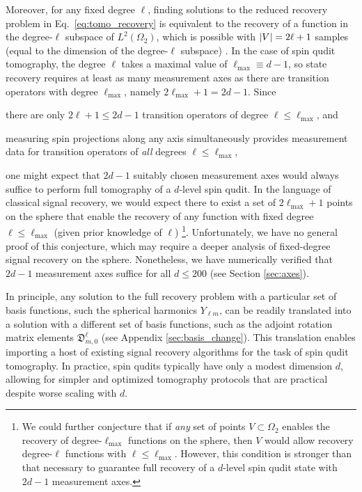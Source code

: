 \documentclass[notitlepage,twocolumn]{revtex4-2}
\renewcommand{\t}{\text} %
\newcommand{\p}[1]{\left(#1\right)} %
\newcommand{\1}{\mathds{1}}
\newcommand{\D}{\mathfrak{D}}
\begin{document}
Moreover, for any fixed degree $\ell$, finding solutions to the reduced recovery problem in Eq.~\eqref{eq:tomo_recovery} is equivalent to the recovery of a function in the degree-$\ell$ subspace of $L^2\p{\Omega_2}$, which is possible with $\abs{V}=2\ell+1$ samples (equal to the dimension of the degree-$\ell$ subspace) \cite{freeden2008spherical}.
In the case of spin qudit tomography, the degree $\ell$ takes a maximal value of $\ell_{\t{max}}\equiv d-1$, so state recovery requires at least as many measurement axes as there are transition operators with degree $\ell_{\t{max}}$, namely $2\ell_{\t{max}}+1=2d-1$.
Since
\begin{enumerate*}
\item there are only $2\ell+1\le2d-1$ transition operators of degree $\ell\le\ell_{\t{max}}$, and
\item measuring spin projections along any axis simultaneously provides measurement data for transition operators of {\it all} degrees $\ell\le\ell_{\t{max}}$,
\end{enumerate*}
one might expect that $2d-1$ suitably chosen measurement axes would always suffice to perform full tomography of a $d$-level spin qudit.
In the language of classical signal recovery, we would expect there to exist a set of $2\ell_{\t{max}}+1$ points on the sphere that enable the recovery of any function with fixed degree $\ell\le\ell_{\t{max}}$ (given prior knowledge of $\ell$) \footnote{We could further conjecture that if {\it any} set of points $V\subset\Omega_2$ enables the recovery of degree-$\ell_{\t{max}}$ functions on the sphere, then $V$ would allow recovery degree-$\ell$ functions with $\ell\le\ell_{\t{max}}$.  However, this condition is stronger than that necessary to guarantee full recovery of a $d$-level spin qudit state with $2d-1$ measurement axes.}.
Unfortunately, we have no general proof of this conjecture, which may require a deeper analysis of fixed-degree signal recovery on the sphere.
Nonetheless, we have numerically verified that $2d-1$ measurement axes suffice for all $d\le200$ (see Section \ref{sec:axes}).

In principle, any solution to the full recovery problem with a particular set of basis functions, such the spherical harmonics $Y_{\ell m}$, can be readily translated into a solution with a different set of basis functions, such as the adjoint rotation matrix elements $\D^\ell_{m,0}$ (see Appendix \ref{sec:basis_change}).
This translation enables importing a host of existing signal recovery algorithms \cite{mcewen2011novel, mcewen2011sampling, rauhut2011sparse, alem2012sparse, khalid2014optimaldimensionality} for the task of spin qudit tomography.
In practice, spin qudits typically have only a modest dimension $d$, allowing for simpler and optimized tomography protocols that are practical despite worse scaling with $d$.
\end{document}
